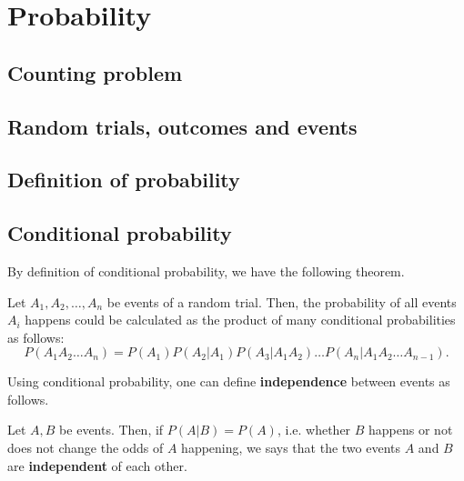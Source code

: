 \chapter{Probability} %
\label{chap:Probability}

\section{Counting problem} %
\label{sec:Counting problem}


\section{Random trials, outcomes and events} %
\label{sec:Random trials, outcomes and events}


\section{Definition of probability} %
\label{sec:Definition of probability}


\section{Conditional probability} %
\label{sec:Conditional probability}

By definition of conditional probability, we have the following theorem.

\begin{theorem}
  Let \( A_{1}, A_{2}, \ldots , A_{n} \) be events of a random trial. Then, the
  probability of all events \( A_{i} \) happens could be calculated as the
  product of many conditional probabilities as follows:
  \[
    P(A_{1}A_{2}\ldots A_{n}) = P(A_{1})P(A_{2} | A_{1})P(A_{3} | A_{1}A_{2})
    \ldots  P(A_{n} | A_{1}A_{2}\ldots A_{n-1})
  .\] 
\end{theorem}

Using conditional probability, one can define \textbf{independence} between
events as follows.

\begin{definition}
\label{def:Independence between events}
Let \( A, B \) be events. Then, if \( P(A | B) = P(A) \), i.e. whether \( B \)
happens or not does not change the odds of \( A \) happening, we says that the
two events \( A \) and \( B \) are \textbf{independent} of each other.
\end{definition}

